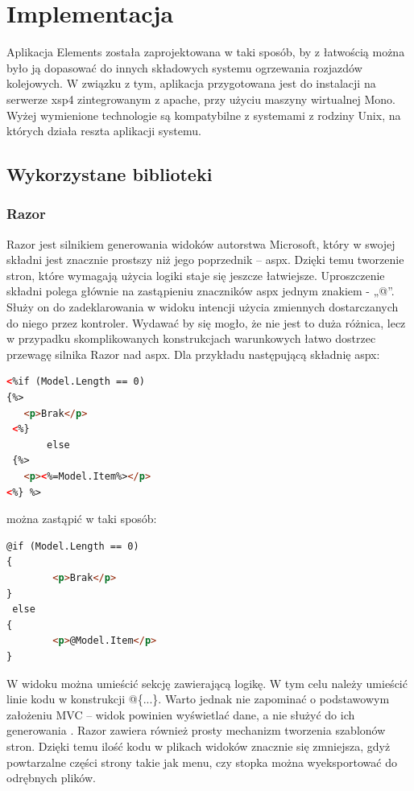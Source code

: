 \chapter{Implementacja}

Aplikacja Elements została zaprojektowana w taki sposób, by z łatwością można było ją dopasować do innych składowych systemu ogrzewania rozjazdów kolejowych. W związku z tym, aplikacja przygotowana jest do instalacji na serwerze xsp4 zintegrowanym z apache, przy użyciu maszyny wirtualnej Mono. Wyżej wymienione technologie są kompatybilne z systemami z rodziny Unix, na których działa reszta aplikacji systemu.

\section{Wykorzystane biblioteki}

\subsection{Razor}

Razor jest silnikiem generowania widoków autorstwa Microsoft, który w swojej składni jest znacznie prostszy niż jego poprzednik – aspx. Dzięki temu tworzenie stron, które wymagają użycia logiki staje się jeszcze łatwiejsze. Uproszczenie składni polega głównie na zastąpieniu znaczników aspx jednym znakiem - „@”. Służy on do zadeklarowania w widoku intencji użycia zmiennych dostarczanych do niego przez kontroler. Wydawać by się mogło, że nie jest to duża różnica, lecz w przypadku skomplikowanych konstrukcjach warunkowych łatwo dostrzec przewagę silnika Razor nad aspx. Dla przykładu następującą składnię aspx:

\begin{lstlisting}[language=HTML]
<%if (Model.Length == 0)
{%>
   <p>Brak</p>
 <%}
       else
 {%>
   <p><%=Model.Item%></p>
<%} %>
\end{lstlisting}
można zastąpić w taki sposób:
\begin{lstlisting}[language=HTML]
@if (Model.Length == 0)
{
        <p>Brak</p>
}
 else
{
        <p>@Model.Item</p>
}
\end{lstlisting}
W widoku można umieścić sekcję zawierającą logikę. W tym celu należy umieścić linie kodu w konstrukcji @\{...\}. Warto jednak nie zapominać o podstawowym założeniu MVC – widok powinien wyświetlać dane, a nie służyć do ich generowania \cite{design-patterns}.
Razor zawiera również prosty mechanizm tworzenia szablonów stron. Dzięki temu ilość kodu w plikach widoków znacznie się zmniejsza, gdyż powtarzalne części strony takie jak menu, czy stopka można wyeksportować do odrębnych plików.

